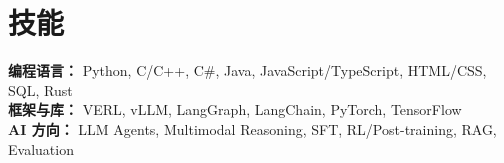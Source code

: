 \section{技能}
 \begin{itemize}[leftmargin=0.15in, label={}]
    \small{\item{
        \textbf{编程语言：} Python, C/C++, C\#, Java, JavaScript/TypeScript, HTML/CSS, SQL, Rust \\
        \textbf{框架与库：} VERL, vLLM, LangGraph, LangChain, PyTorch, TensorFlow\\
        \textbf{AI 方向：} LLM Agents, Multimodal Reasoning, SFT, RL/Post-training, RAG, Evaluation
    }}
 \end{itemize}
